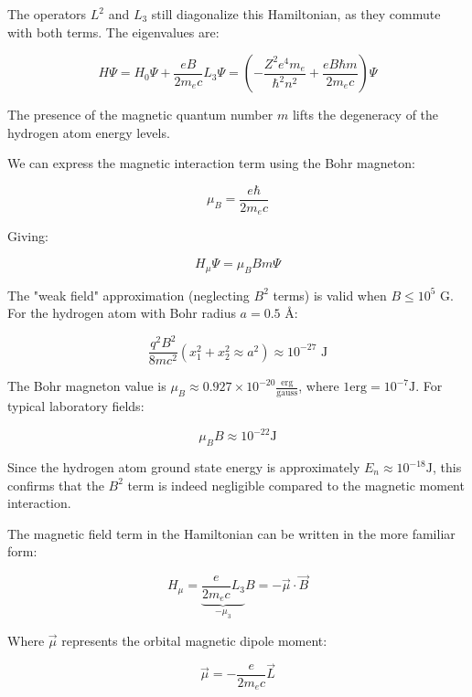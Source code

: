 The operators $L^2$ and $L_3$ still diagonalize this Hamiltonian, as they commute with both terms. The eigenvalues are:

\begin{equation}
H\Psi=H_0\Psi+\frac{eB}{2m_e c}L_3\Psi=\left(-\frac{Z^2e^4m_e}{\hbar^2n^2}+\frac{eB\hbar m}{2m_e c}\right)\Psi
\end{equation}

The presence of the magnetic quantum number $m$ lifts the degeneracy of the hydrogen atom energy levels.

We can express the magnetic interaction term using the Bohr magneton:

\begin{equation}
\mu_B=\frac{e\hbar}{2m_e c}
\end{equation}

Giving:

\begin{equation}
H_\mu\Psi=\mu_B Bm\Psi
\end{equation}

The "weak field" approximation (neglecting $B^2$ terms) is valid when $B\leq 10^5$ G. For the hydrogen atom with Bohr radius $a=0.5$ Å:

\begin{equation}
\frac{q^2B^2}{8mc^2}(x_1^2+x_2^2\approx a^2)\approx 10^{-27} \text{ J}
\end{equation}


The Bohr magneton value is $\mu_{B} \approx 0.927 \times 10^{-20} \frac{\text{erg}}{\text{gauss}}$, where $1 \text{erg}=10^{-7} \text{J}$. For typical laboratory fields:

\begin{equation}
\mu_{B}B \approx 10^{-22} \text{J}
\end{equation}

Since the hydrogen atom ground state energy is approximately $E_n \approx 10^{-18} \text{J}$, this confirms that the $B^2$ term is indeed negligible compared to the magnetic moment interaction.

The magnetic field term in the Hamiltonian can be written in the more familiar form:

\begin{equation}
H_{\mu}=\underbrace{\frac{e}{2m_e c}L_3}_{-\mu_3}B=-\vec{\mu}\cdot\vec{B}
\end{equation}

Where $\vec{\mu}$ represents the orbital magnetic dipole moment:

\begin{equation}
\vec{\mu}=-\frac{e}{2m_e c}\vec{L}
\end{equation}

